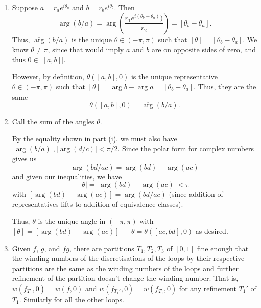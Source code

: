 \documentclass[12 pt, letterpaper]{hmcpset}
\begin{document}
\begin{solution}
	\begin{enumerate}
		\item Suppose $a = r_{a} e^{i \theta_{a}}$ and $b = r_{b} e^{i \theta_{b}}$. Then
			\[
				\operatorname{arg}(b / a) = \operatorname{arg} \left ( \frac{r_{1} e^{i (\theta_{b} - \theta_{a})})}{r_{2}} \right ) = [\theta_{b} - \theta_{a}].
			\]
			Thus, $\overline{\operatorname{arg}}(b / a)$ is the unique $\theta \in (-\pi, \pi)$ such that $[\theta] = [\theta_{b} - \theta_{a}]$. We know $\theta \neq \pi$, since that would imply $a$ and $b$ are on opposite sides of zero, and thus $0 \in \lvert [a, b] \rvert$.

			However, by definition, $\theta([a, b], 0)$ is the unique representative $\theta \in (-\pi, \pi)$ such that $[\theta] = \operatorname{arg} b - \operatorname{arg} a = [\theta_{b} - \theta_{a}]$. Thus, they are the same ---
			\[
				\theta([a, b], 0) = \overline{\operatorname{arg}}(b / a).
			\]
		\item Call the sum of the angles $\theta$.

			By the equality shown in part (i), we must also have $\lvert \overline{\operatorname{arg}}(b / a) \rvert, \lvert \overline{\operatorname{arg}}(d / c) \rvert < \pi / 2$. Since the polar form for complex numbers gives us
			\[
				\operatorname{arg}(bd / ac) = \operatorname{arg}(bd) - \operatorname{arg}(ac)
			\]
			and given our inequalities, we have
			\[
				\lvert \theta \rvert = \lvert \overline{\operatorname{arg}}(bd) - \overline{\operatorname{arg}}(ac) \rvert < \pi	
			\]
			with $[\overline{\operatorname{arg}}(bd) - \overline{\operatorname{arg}}(ac)] = \operatorname{arg}(bd / ac)$ (since addition of representatives lifts to addition of equivalence classes).

			Thus, $\theta$ is the unique angle in $(-\pi, \pi)$ with $[\theta] = [\operatorname{arg}(bd) - \operatorname{arg}(ac)]$ --- $\theta = \theta([ac, bd], 0)$ as desired.
		\item Given $f$, $g$, and $fg$, there are partitions $T_{1}, T_{2}, T_{3}$ of $[0, 1]$ fine enough that the winding numbers of the discretisations of the loops by their respective partitions are the same as the winding numbers of the loops and further refinement of the partition doesn't change the winding number. That is, $w(f_{T_{1}}, 0) = w(f, 0)$ and $w(f_{T_{1}'}, 0) = w(f_{T_{1}}, 0)$ for any refinement $T_{1}'$ of $T_{1}$. Similarly for all the other loops.


\end{enumerate}
\end{solution}
\end{document}
